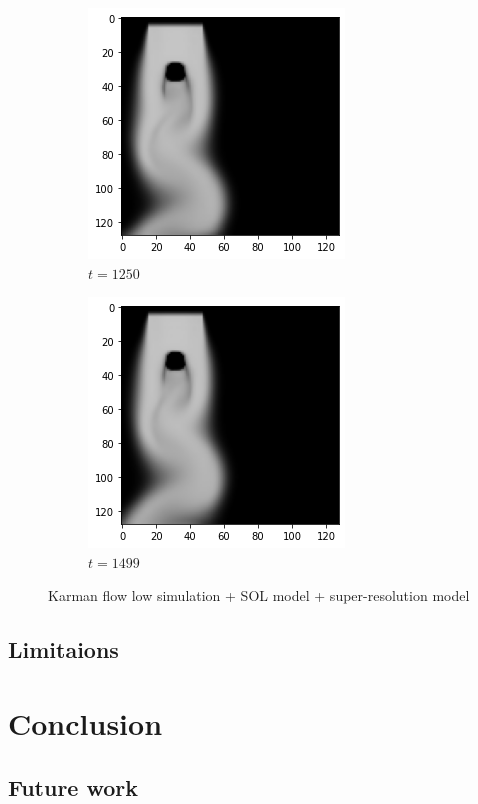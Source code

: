 \documentclass[a4paper,12pt,twoside]{report}
\begin{document}
\begin{figure}
\begin{subfigure}{0.18\textwidth}
	\end{subfigure}
	\begin{subfigure}{0.18\textwidth}
		\centering
		\includegraphics[scale=0.3]{timecost/low1250.png}
		\caption{$t=1250$}
	\end{subfigure}
	\begin{subfigure}{0.18\textwidth}
		\centering
		\includegraphics[scale=0.3]{timecost/low1499.png}
		\caption{$t=1499$}
	\end{subfigure}
	\caption{Karman flow low simulation + SOL model + super-resolution model}
\end{figure}

\section{Limitaions}






\chapter{Conclusion}
\section{Future work}
\end{document}
